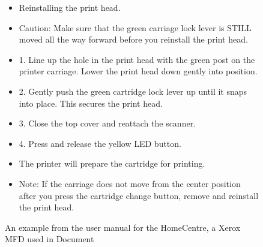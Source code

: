 \begin{figure}[H]
    \centering
    \begin{framed}
    
    \begin{itemize}
        \item Reinstalling the print head.
        \item Caution: Make sure that the green carriage lock lever is STILL moved all the way forward before you reinstall the print head.
        \item 1. Line up the hole in the print head with the green post on the printer carriage.
        Lower the print head down gently into position.
        \item 2. Gently push the green cartridge lock lever up until it snaps into place.
        This secures the print head.
        \item 3. Close the top cover and reattach the scanner.
        \item 4. Press and release the yellow LED button.
        \item The printer will prepare the cartridge for printing.
        \item Note: If the carriage does not move from the center position after you press the cartridge change button, remove and reinstall the print head.
    \end{itemize}
    
    \end{framed}
    \caption{An example from the user manual for the HomeCentre, a Xerox MFD used in Document \citet{trans}}                
\end{figure}